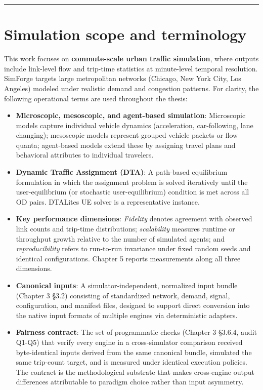 \begin{center}\rule{0.5\linewidth}{0.5pt}\end{center}

\section{Simulation scope and
terminology}\label{22-simulation-scope-and-terminology}

This work focuses on \textbf{commute-scale urban traffic simulation},
where outputs include link-level flow and trip-time statistics at
minute-level temporal resolution. SimForge targets large metropolitan
networks (Chicago, New York City, Los Angeles) modeled under realistic
demand and congestion patterns. For clarity, the following operational
terms are used throughout the thesis:

\begin{itemize}
\item
  \textbf{Microscopic, mesoscopic, and agent-based simulation}:
  Microscopic models capture individual vehicle dynamics (acceleration,
  car-following, lane changing); mesoscopic models represent grouped
  vehicle packets or flow quanta; agent-based models extend these by
  assigning travel plans and behavioral attributes to individual
  travelers.
\item
  \textbf{Dynamic Traffic Assignment (DTA)}: A path-based equilibrium
  formulation in which the assignment problem is solved iteratively
  until the user-equilibrium (or stochastic user-equilibrium) condition
  is met across all OD pairs. DTALite\textquotesingle s UE solver is a
  representative instance.
\item
  \textbf{Key performance dimensions}: \emph{Fidelity} denotes agreement
  with observed link counts and trip-time distributions;
  \emph{scalability} measures runtime or throughput growth relative to
  the number of simulated agents; and \emph{reproducibility} refers to
  run-to-run invariance under fixed random seeds and identical
  configurations. Chapter 5 reports measurements along all three
  dimensions.
\item
  \textbf{Canonical inputs}: A simulator-independent, normalized input
  bundle (Chapter 3 §3.2) consisting of standardized network, demand,
  signal, configuration, and manifest files, designed to support direct
  conversion into the native input formats of multiple engines via
  deterministic adapters.
\item
  \textbf{Fairness contract}: The set of programmatic checks (Chapter 3
  §3.6.4, audit Q1-Q5) that verify every engine in a cross-simulator
  comparison received byte-identical inputs derived from the same
  canonical bundle, simulated the same trip-count target, and is
  measured under identical execution policies. The contract is the
  methodological substrate that makes cross-engine output differences
  attributable to paradigm choice rather than input asymmetry.
\end{itemize}

